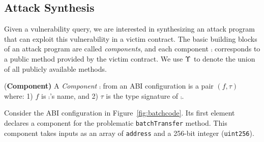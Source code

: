\subsection{Attack Synthesis}\label{sec:attack}

Given a vulnerability query, we are interested in synthesizing an attack 
program that can exploit this vulnerability in a victim contract. 
The basic building blocks of an attack program are called 
\emph{components}, and each component $\comp$ corresponds to a public method provided by the  
victim contract. We use $\Upsilon$ to denote the union of all publicly available 
methods.

\begin{definition}{{(\bf Component)}}
A \emph{Component} $\comp$ from an ABI configuration is a pair $(f, \tau)$ where: 1) $f$ is $\comp$'s name, and 2) $\tau$ is the type signature of $\comp$.
\end{definition}

\begin{example}
Consider the ABI configuration in Figure~\ref{fig:batchcode}. Its first element 
declares a component for the problematic \texttt{batchTransfer} method. 
This component takes inputs as an 
array of \texttt{address} and a 256-bit integer (\texttt{uint256}). 
\end{example}



